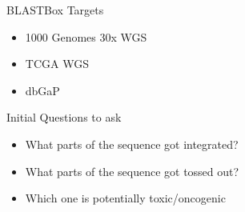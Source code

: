 \documentclass[bigger]{beamer}
\begin{document}
\begin{frame}[label={sec:org2a13ece}]{BLASTBox Targets}
\begin{itemize}
\item 1000 Genomes 30x WGS
\item TCGA WGS
\item dbGaP
\end{itemize}
\end{frame}

\begin{frame}[label={sec:org69a800a}]{Initial Questions to ask}
\begin{itemize}
\item What parts of the sequence got integrated?
\item What parts of the sequence got tossed out?
\item Which one is potentially toxic/oncogenic
\end{itemize}
\end{frame}
\end{document}
